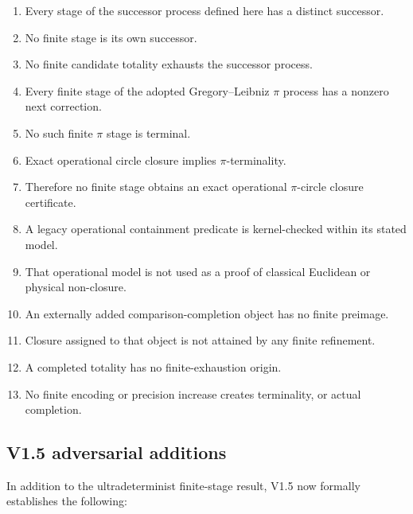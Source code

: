 \documentclass[11pt,a4paper]{article}
\begin{document}
\begin{enumerate}[label=\arabic*.]
\item Every stage of the successor process defined here has a distinct successor.

\item No finite stage is its own successor.

\item No finite candidate totality exhausts the successor process.

\item Every finite stage of the adopted Gregory--Leibniz $\pi$ process
      has a nonzero next correction.

\item No such finite $\pi$ stage is terminal.

\item Exact operational circle closure implies $\pi$-terminality.

\item Therefore no finite stage obtains an exact operational
      $\pi$-circle closure certificate.

\item A legacy operational containment predicate is kernel-checked within its stated model.

\item That operational model is not used as a proof of classical Euclidean or physical non-closure.

\item An externally added comparison-completion object has no finite preimage.

\item Closure assigned to that object is not attained by any finite
      refinement.

\item A completed totality has no finite-exhaustion origin.

\item No finite encoding or precision increase creates terminality,
      or actual completion.
\end{enumerate}


\subsection*{V1.5 adversarial additions}

In addition to the ultradeterminist finite-stage result, V1.5 now
formally establishes the following:
\end{document}
